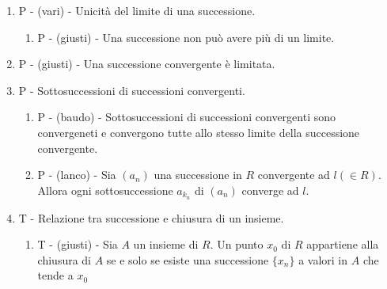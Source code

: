 \documentclass[]{article}
\begin{document}
\begin{enumerate}
	\item P - (vari) - Unicit\`a del limite di una successione. 
	          \begin{enumerate}
	          	\item P - (giusti) - Una successione non pu\`o avere pi\`u di un limite.
	          \end{enumerate}
	\item P - (giusti) - Una successione convergente \`e limitata.
	
	\item P - Sottosuccessioni di successioni convergenti. 
	      \begin{enumerate}
		\item P - (baudo) - Sottosuccessioni di successioni convergenti sono convergeneti e convergono tutte allo stesso limite della successione convergente.
		\item P - (lanco) - Sia $(a_n)$ una successione in $R$ convergente ad $l(\in R)$. Allora ogni sottosuccessione $a_{k_n}$ di $(a_n)$ converge ad $l$.
	      \end{enumerate}	

	\item T - Relazione tra successione e chiusura di un insieme.
	      \begin{enumerate}
		      \item T - (giusti) - Sia $A$ un insieme di $R$. Un punto $x_0$ di $R$ appartiene alla chiusura di $A$ se e solo se esiste una successione $\{x_n\}$ a valori in $A$ che tende a $x_0$
	      \end{enumerate}						    
\end{enumerate}
\end{document}
